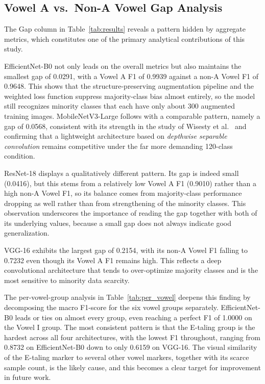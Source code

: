 \documentclass[conference]{IEEEtran}
\begin{document}
\subsection{Vowel A vs.\ Non-A Vowel Gap Analysis}

The Gap column in Table~\ref{tab:results} reveals a pattern hidden
by aggregate metrics, which constitutes one of the primary analytical
contributions of this study.

EfficientNet-B0 not only leads on the overall metrics but also
maintains the smallest gap of 0.0291, with a Vowel A F1 of 0.9939
against a non-A Vowel F1 of 0.9648.
This shows that the structure-preserving augmentation pipeline and the
weighted loss function suppress majority-class bias almost entirely, so
the model still recognizes minority classes that each have only about
300 augmented training images.
MobileNetV3-Large follows with a comparable pattern, namely a gap of
0.0568, consistent with its strength in the study of Wisesty et
al.~\cite{wisesty2026} and confirming that a lightweight architecture
based on \textit{depthwise separable convolution} remains competitive
under the far more demanding 120-class condition.

ResNet-18 displays a qualitatively different pattern.
Its gap is indeed small (0.0416), but this stems from a relatively low
Vowel A F1 (0.9010) rather than a high non-A Vowel F1, so its balance
comes from majority-class performance dropping as well rather than from
strengthening of the minority classes.
This observation underscores the importance of reading the gap together
with both of its underlying values, because a small gap does not always
indicate good generalization.

VGG-16 exhibits the largest gap of 0.2154, with its non-A Vowel F1
falling to 0.7232 even though its Vowel A F1 remains high.
This reflects a deep convolutional architecture that tends to
over-optimize majority classes and is the most sensitive to minority
data scarcity.

The per-vowel-group analysis in Table~\ref{tab:per_vowel} deepens this
finding by decomposing the macro F1-score for the six vowel groups
separately.
EfficientNet-B0 leads or ties on almost every group, even reaching a
perfect F1 of 1.0000 on the Vowel I group.
The most consistent pattern is that the E-taling group is the hardest
across all four architectures, with the lowest F1 throughout, ranging
from 0.8732 on EfficientNet-B0 down to only 0.6159 on VGG-16.
The visual similarity of the E-taling marker to several other vowel
markers, together with its scarce sample count, is the likely cause,
and this becomes a clear target for improvement in future work.
\end{document}
